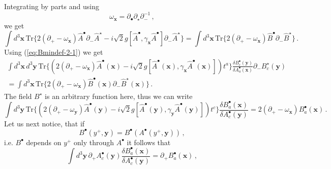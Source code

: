 \documentclass[english,american]{article}
\begin{document}
Integrating by parts and using
\begin{equation}
\omega_{\mathbf{x}}=\partial_{\bullet}\partial_{\star}\partial_{-}^{-1}\,,
\end{equation}
we get
\begin{equation}
\int d^{3}\mathbf{x}\,\mathrm{Tr}\Bigg\{2\left(\partial_{+}-\omega_{\mathbf{x}}\right)\hat{A}^{\bullet}\partial_{-}\hat{A}^{\star}-i\sqrt{2}g\left[\hat{A}^{\bullet},\gamma_{\mathbf{x}}\hat{A}^{\bullet}\right]\partial_{-}\hat{A}^{\star}\Bigg\}=\int d^{3}\mathbf{x}\,\mathrm{Tr}\Bigg\{2\left(\partial_{+}-\omega_{\mathbf{x}}\right)\hat{B}^{\bullet}\partial_{-}\hat{B}^{\star}\Bigg\}\,.
\end{equation}
Using (\ref{eq:Bmindef-2-1}) we get
\begin{multline}
\int d^{3}\mathbf{x}\, d^{3}\mathbf{y}\,\mathrm{Tr}\Bigg\{\left(2\left(\partial_{+}-\omega_{\mathbf{x}}\right)\hat{A}^{\bullet}\left(\mathbf{x}\right)-i\sqrt{2}g\left[\hat{A}^{\bullet}\left(\mathbf{x}\right),\gamma_{\mathbf{x}}\hat{A}^{\bullet}\left(\mathbf{x}\right)\right]\right)t^{a}\Bigg\}\frac{\delta B_{c}^{\bullet}\left(\mathbf{y}\right)}{\delta A_{a}^{\bullet}\left(\mathbf{x}\right)}\partial_{-}B_{c}^{\star}\left(\mathbf{y}\right)\\
=\int d^{3}\mathbf{x}\,\mathrm{Tr}\Bigg\{2\left(\partial_{+}-\omega_{\mathbf{x}}\right)\hat{B}^{\bullet}\left(\mathbf{x}\right)\partial_{-}\hat{B}^{\star}\left(\mathbf{x}\right)\Bigg\}\,.
\end{multline}
The field $B^{\star}$ is an arbitrary function here, thus we can
write
\begin{equation}
\int d^{3}\mathbf{y}\,\mathrm{Tr}\Bigg\{\left(2\left(\partial_{+}-\omega_{\mathbf{y}}\right)\hat{A}^{\bullet}\left(\mathbf{y}\right)-i\sqrt{2}g\left[\hat{A}^{\bullet}\left(\mathbf{y}\right),\gamma_{\mathbf{y}}\hat{A}^{\bullet}\left(\mathbf{y}\right)\right]\right)t^{c}\Bigg\}\frac{\delta B_{a}^{\bullet}\left(\mathbf{x}\right)}{\delta A_{c}^{\bullet}\left(\mathbf{y}\right)}=2\left(\partial_{+}-\omega_{\mathbf{x}}\right)B_{a}^{\bullet}\left(\mathbf{x}\right)\,.
\end{equation}
Let us next notice, that if
\begin{equation}
B^{\bullet}\left(y^{+},\mathbf{y}\right)=B^{\bullet}\left(A^{\bullet}\left(y^{+},\mathbf{y}\right)\right)\,,
\end{equation}
i.e. $B^{\bullet}$ depends on $y^{+}$ only through $A^{\bullet}$
it follows that
\begin{equation}
\int d^{3}\mathbf{y}\,\partial_{+}A_{c}^{\bullet}\left(\mathbf{y}\right)\frac{\delta B_{a}^{\bullet}\left(\mathbf{x}\right)}{\delta A_{c}^{\bullet}\left(\mathbf{y}\right)}=\partial_{+}B_{a}^{\bullet}\left(\mathbf{x}\right)\,,
\end{equation}
\end{document}
